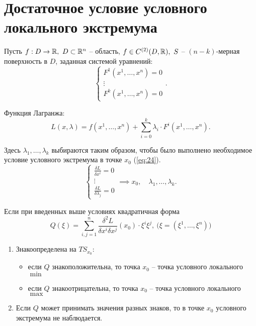 

\section*{Достаточное условие условного локального экстремума}

\begin{note}
    Пусть $f:D\rightarrow\mathbb{R}, \ D \subset \mathbb{R}^n$ -- область, $f \in C^{(2)} (D,\mathbb{R}), \ S$ -- $(n-k)$-мерная поверхность в $D$, заданная системой уравнений:
    \[
        \left\{\begin{array}{l}
            F^1(x^1,\ldots,x^n) = 0 \\
            \vdots                  \\
            F^k(x^1,\ldots,x^n) = 0
        \end{array}\right..
    \]

    Функция Лагранжа:
    \[
        L(x,\lambda) = f(x^1,\ldots,x^n) + \sum_{i = 0}^{k}\lambda_i \cdot F^i(x^1,\ldots,x^n).
    \]

    Здесь $\lambda_1,\ldots,\lambda_k$ выбираются таким образом, чтобы было выполнено необходимое условие условного экстремума в точке $x_0$ (\ref{eq:24}).
    \[
        \left\{\begin{array}{l}
            \frac{\delta L}{\delta x^i} = 0 \\
            \vdots                          \\
            \frac{\delta L}{\delta \lambda_j} = 0
        \end{array}\right. \implies x_0,\quad \lambda_1,\ldots,\lambda_k.
    \]
\end{note}

\begin{theorem}
    Если при введенных выше условиях квадратичная форма
    \[
        Q(\xi) = \sum_{i,j=1}^{n}\frac{\delta^2 L}{\delta x^i \delta x^j}(x_0)\cdot\xi^i\xi^j,\ \big(\xi=(\xi^1,\ldots,\xi^n)\big)
    \]
    \begin{enumerate}
        \item Знакоопределена на $TS_{x_0}$:
              \begin{itemize}
                  \item если $Q$ знакоположительна, то точка $x_0$ -- точка условного локального $\min$
                  \item если $Q$ знакоотрицательна, то точка $x_0$ -- точка условного локального $\max$
              \end{itemize}
        \item Если $Q$ может принимать значения разных знаков, то в точке $x_0$ условного экстремума не наблюдается.
    \end{enumerate}
\end{theorem}

